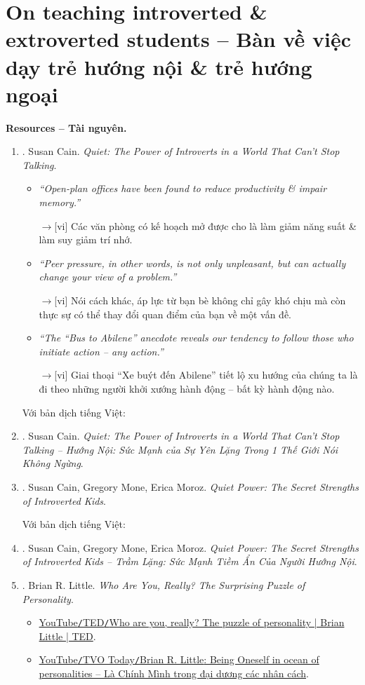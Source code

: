 \documentclass[12pt,oneside]{book}
\begin{document}
\section{On teaching introverted \& extroverted students -- Bàn về việc dạy trẻ hướng nội \& trẻ hướng ngoại}
{\bf \textsf{Resources -- Tài nguyên.}}
\begin{enumerate}
	\item \cite{Cain_quiet}. {\sc Susan Cain}. {\it Quiet: The Power of Introverts in a World That Can't Stop Talking}.
	\begin{itemize}
		\item {\it``Open-plan offices have been found to reduce productivity \& impair memory.''}
		
		{\sf[en]$\to$[vi]} Các văn phòng có kế hoạch mở được cho là làm giảm năng suất \& làm suy giảm trí nhớ.
		
		\item {\it``Peer pressure, in other words, is not only unpleasant, but can actually change your view of a problem.''}
		
		{\sf[en]$\to$[vi]} Nói cách khác, áp lực từ bạn bè không chỉ gây khó chịu mà còn thực sự có thể thay đổi quan điểm của bạn về một vấn đề.
		
		\item {\it``The ``Bus to Abilene'' anecdote reveals our tendency to follow those who initiate action -- any action.''}
		
		{\sf[en]$\to$[vi]} Giai thoại “Xe buýt đến Abilene” tiết lộ xu hướng của chúng ta là đi theo những người khởi xướng hành động -- bất kỳ hành động nào.
	\end{itemize}
	Với bản dịch tiếng Việt:
	\item \cite{Cain_quiet_VN}. {\sc Susan Cain}. {\it Quiet: The Power of Introverts in a World That Can't Stop Talking -- Hướng Nội: Sức Mạnh của Sự Yên Lặng Trong 1 Thế Giới Nói Không Ngừng}.
	\item \cite{Cain_Mone_Moroz_quiet_power}. {\sc Susan Cain, Gregory Mone, Erica Moroz}. {\it Quiet Power: The Secret Strengths of Introverted Kids}.
	
	Với bản dịch tiếng Việt:
	\item \cite{Cain_Mone_Moroz_quiet_power_VN}. {\sc Susan Cain, Gregory Mone, Erica Moroz}. {\it Quiet Power: The Secret Strengths of Introverted Kids -- Trầm Lặng: Sức Mạnh Tiềm Ẩn Của Người Hướng Nội}.
	\item \cite{Little_personality}. {\sc Brian R. Little}. {\it Who Are You, Really? The Surprising Puzzle of Personality}.
	\begin{itemize}
		\item \href{https://www.youtube.com/watch?v=qYvXk_bqlBk}{YouTube{\tt/}TED{\tt/}Who are you, really? The puzzle of personality | Brian Little | TED}.
		\item \href{https://www.youtube.com/watch?v=XGinP10Jmv8}{YouTube{\tt/}TVO Today{\tt/}{\sc Brian R. Little}: Being Oneself in ocean of personalities -- Là Chính Mình trong đại dương các nhân cách}.
		

\end{itemize}
\end{enumerate}
\end{document}
